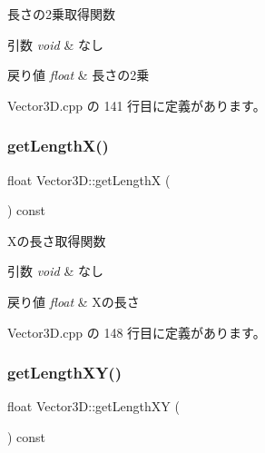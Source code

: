 長さの2乗取得関数 


\begin{DoxyParams}{引数}
{\em void} & なし \\
\hline
\end{DoxyParams}

\begin{DoxyRetVals}{戻り値}
{\em float} & 長さの2乗 \\
\hline
\end{DoxyRetVals}


 Vector3\+D.\+cpp の 141 行目に定義があります。

\mbox{\label{class_vector3_d_a83f6e201a88329e7d4e966045ce4c535}} 
\subsubsection{\texorpdfstring{get\+Length\+X()}{getLengthX()}}
{\footnotesize\ttfamily float Vector3\+D\+::get\+LengthX (\begin{DoxyParamCaption}{ }\end{DoxyParamCaption}) const}



Xの長さ取得関数 


\begin{DoxyParams}{引数}
{\em void} & なし \\
\hline
\end{DoxyParams}

\begin{DoxyRetVals}{戻り値}
{\em float} & Xの長さ \\
\hline
\end{DoxyRetVals}


 Vector3\+D.\+cpp の 148 行目に定義があります。

\mbox{\label{class_vector3_d_a59f0095984eee6b0cdb72f1da7647a57}} 
\subsubsection{\texorpdfstring{get\+Length\+X\+Y()}{getLengthXY()}}
{\footnotesize\ttfamily float Vector3\+D\+::get\+Length\+XY (\begin{DoxyParamCaption}{ }\end{DoxyParamCaption}) const}



